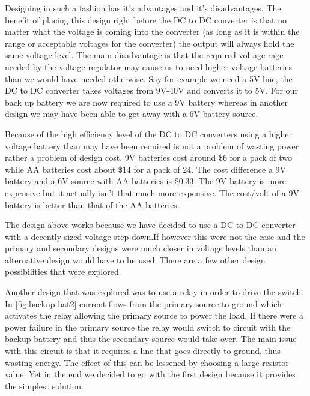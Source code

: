 Designing in such a fashion has it{}'s advantages and it{}'s disadvantages. The
benefit of placing this design right before the DC to DC converter is that no
matter what the voltage is coming into the converter (as long as it is within
the range or acceptable voltages for the converter) the output will always hold
the same voltage level. The main disadvantage is that the required voltage rage
needed by the voltage regulator may cause us to need higher voltage batteries
than we would have needed otherwise. Say for example we need a 5V line, the DC
to DC converter takes voltages from 9V{}-40V and converts it to 5V. For our
back up battery we are now required to use a 9V battery whereas in another
design we may have been able to get away with a 6V battery source.

Because of the high efficiency level of the DC to DC converters using a higher
voltage battery than may have been required is not a problem of wasting power
rather a problem of design cost. 9V batteries cost around \$6 for a pack of two
while AA batteries cost about \$14 for a pack of 24. The cost difference a 9V
battery and a 6V source with AA batteries is \$0.33. The 9V battery is more
expensive but it actually isn{}'t that much more expensive. The cost/volt of a
9V battery is better than that of the AA batteries.

The design above works because we have decided to use a DC to DC converter with
a decently sized voltage step down.If however this were not the case and the
primary and secondary designs were much closer in voltage levels than an
alternative design would have to be used. There are a few other design
possibilities that were explored.

Another design that was explored was to use a relay in order to drive the
switch. In \autoref{fig:backup-bat2} current flows from the primary source to
ground which activates the relay allowing the primary source to power the load.
If there were a power failure in the primary source the relay would switch to
circuit with the backup battery and thus the secondary source would take over.
The main issue with this circuit is that it requires a line that goes directly
to ground, thus wasting energy. The effect of this can be lessened by choosing
a large resistor value. Yet in the end we decided to go with the first design
because it provides the simplest solution.


